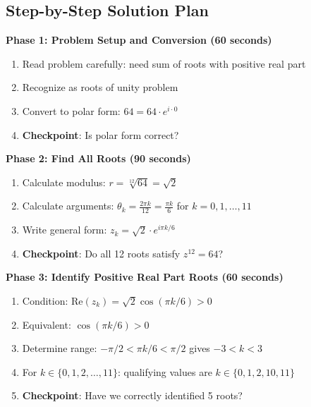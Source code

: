 \documentclass[11pt]{article}
\begin{document}
\begin{roadmapbox}
\subsection*{Step-by-Step Solution Plan}

\textbf{Phase 1: Problem Setup and Conversion (60 seconds)}
\begin{enumerate}[leftmargin=*]
    \item Read problem carefully: need sum of roots with positive real part
    \item Recognize as roots of unity problem
    \item Convert to polar form: $64 = 64 \cdot e^{i \cdot 0}$
    \item \textbf{Checkpoint}: Is polar form correct? \checkmark
\end{enumerate}

\textbf{Phase 2: Find All Roots (90 seconds)}
\begin{enumerate}[leftmargin=*]
    \item Calculate modulus: $r = \sqrt[12]{64} = \sqrt{2}$
    \item Calculate arguments: $\theta_k = \frac{2\pi k}{12} = \frac{\pi k}{6}$ for $k=0,1,\ldots,11$
    \item Write general form: $z_k = \sqrt{2} \cdot e^{i\pi k/6}$
    \item \textbf{Checkpoint}: Do all 12 roots satisfy $z^{12}=64$? \checkmark
\end{enumerate}

\textbf{Phase 3: Identify Positive Real Part Roots (60 seconds)}
\begin{enumerate}[leftmargin=*]
    \item Condition: $\text{Re}(z_k) = \sqrt{2}\cos(\pi k/6) > 0$
    \item Equivalent: $\cos(\pi k/6) > 0$
    \item Determine range: $-\pi/2 < \pi k/6 < \pi/2$ gives $-3 < k < 3$
    \item For $k \in \{0,1,2,\ldots,11\}$: qualifying values are $k \in \{0,1,2,10,11\}$
    \item \textbf{Checkpoint}: Have we correctly identified 5 roots? \checkmark
\end{enumerate}


\end{roadmapbox}
\end{document}

